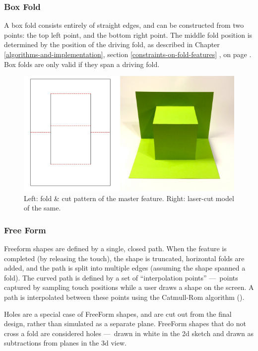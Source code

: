 \subsubsection{Box Fold}\label{box-fold}

A box fold consists entirely of straight edges, and can be constructed
from two points: the top left point, and the bottom right point. The
middle fold position is determined by the position of the driving fold,
as described in Chapter \ref{algorithms-and-implementation}, section
\ref{constraints-on-fold-features} ,
 on page
\pageref{geometric-constraints}. Box folds are only valid if they span a
driving fold.

\begin{figure}[htbp]
\centering
\includegraphics{figures/33_UI_Interface_Data_Structures/box.pdf}
\caption{Left: fold \& cut pattern of the master feature. Right:
laser-cut model of the same.}
\end{figure}

\subsubsection{Free Form}\label{free-form}

Freeform shapes are defined by a single, closed path. When the feature
is completed (by releasing the touch), the shape is truncated,
horizontal folds are added, and the path is split into multiple edges
(assuming the shape spanned a fold). The curved path is defined by a set
of ``interpolation points'' ---~points captured by sampling touch
positions while a user draws a shape on the screen. A path is
interpolated between these points using the Catmull-Rom algorithm
(\citet{catmull1974class}).

Holes are a special case of FreeForm shapes, and are cut out from the
final design, rather than simulated as a separate plane. FreeForm shapes
that do not cross a fold are considered holes ---~drawn in white in the
2d sketch and drawn as subtractions from planes in the 3d view.

